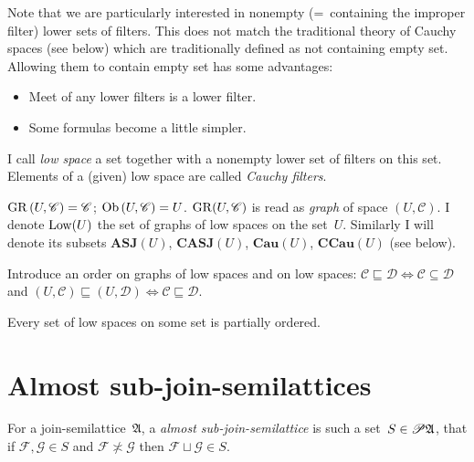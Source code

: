 \begin{rem}
Note that we are particularly interested in nonempty (=~containing the improper filter) lower sets of filters.
This does not match the traditional theory of Cauchy spaces (see below) which are traditionally defined as not containing empty set.
Allowing them to contain empty set has some advantages:
\begin{itemize}
\item Meet of any lower filters is a lower filter.
\item Some formulas become a little simpler.
\end{itemize}
\end{rem}


\begin{defn}
  I call \emph{low space} a set together with a nonempty lower set of
  filters on this set.
  Elements of a (given) low space are called \emph{Cauchy filters}.
\end{defn}

\begin{defn}
  $\operatorname{GR} \left( U , \mathscr{C} \right) = \mathscr{C}$; $\operatorname{Ob} \left(
  U , \mathscr{C} \right) = U$.
  $\operatorname{GR} (U, \mathscr{C})$ is read as \emph{graph} of space $(U, \mathscr{C})$.
  I denote $\operatorname{Low}(U)$ the set of graphs of low spaces on the set~$U$.
  Similarly I will denote its subsets $\mathbf{ASJ}(U)$, $\mathbf{CASJ}(U)$, $\mathbf{Cau}(U)$, $\mathbf{CCau}(U)$ (see below).
\end{defn}


\begin{defn}
  Introduce an order on graphs of low spaces and on low spaces:
  $\mathscr{C}\sqsubseteq\mathscr{D}\Leftrightarrow\mathscr{C}\subseteq\mathscr{D}$ and
  $\left( U , \mathscr{C} \right) \sqsubseteq \left( U , \mathscr{D} \right) \Leftrightarrow \mathscr{C} \sqsubseteq \mathscr{D}$.
\end{defn}

\begin{obvious}
Every set of low spaces on some set is partially ordered.
\end{obvious}

\section{Almost sub-join-semilattices}

\begin{defn}
For a join-semilattice~$\mathfrak{A}$, a \emph{almost sub-join-semilattice} is such a set~$S\in\mathscr{P}\mathfrak{A}$, that
if $\mathcal{F},\mathcal{G}\in S$ and $\mathcal{F} \nasymp \mathcal{G}$ then $\mathcal{F} \sqcup \mathcal{G}\in S$.
\end{defn}

